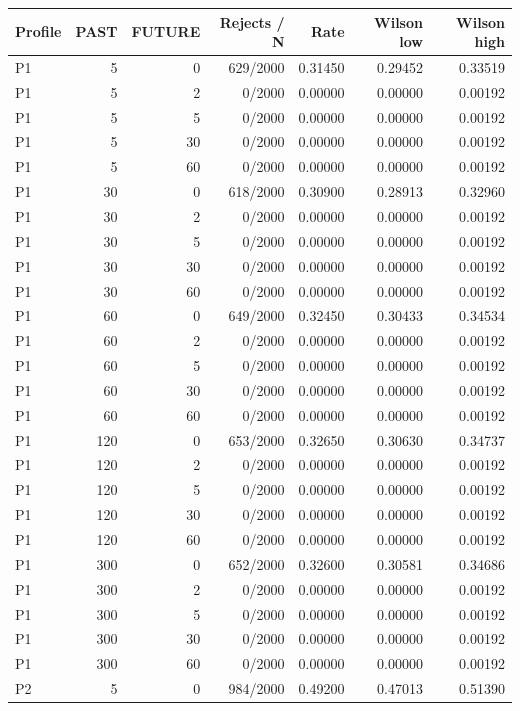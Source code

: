 \begin{tabular}{lrrrrrr}\toprule
Profile & PAST & FUTURE & Rejects / N & Rate & Wilson low & Wilson high \\
\midrule
P1 & 5 & 0 & 629/2000 & 0.31450 & 0.29452 & 0.33519 \\
P1 & 5 & 2 & 0/2000 & 0.00000 & 0.00000 & 0.00192 \\
P1 & 5 & 5 & 0/2000 & 0.00000 & 0.00000 & 0.00192 \\
P1 & 5 & 30 & 0/2000 & 0.00000 & 0.00000 & 0.00192 \\
P1 & 5 & 60 & 0/2000 & 0.00000 & 0.00000 & 0.00192 \\
P1 & 30 & 0 & 618/2000 & 0.30900 & 0.28913 & 0.32960 \\
P1 & 30 & 2 & 0/2000 & 0.00000 & 0.00000 & 0.00192 \\
P1 & 30 & 5 & 0/2000 & 0.00000 & 0.00000 & 0.00192 \\
P1 & 30 & 30 & 0/2000 & 0.00000 & 0.00000 & 0.00192 \\
P1 & 30 & 60 & 0/2000 & 0.00000 & 0.00000 & 0.00192 \\
P1 & 60 & 0 & 649/2000 & 0.32450 & 0.30433 & 0.34534 \\
P1 & 60 & 2 & 0/2000 & 0.00000 & 0.00000 & 0.00192 \\
P1 & 60 & 5 & 0/2000 & 0.00000 & 0.00000 & 0.00192 \\
P1 & 60 & 30 & 0/2000 & 0.00000 & 0.00000 & 0.00192 \\
P1 & 60 & 60 & 0/2000 & 0.00000 & 0.00000 & 0.00192 \\
P1 & 120 & 0 & 653/2000 & 0.32650 & 0.30630 & 0.34737 \\
P1 & 120 & 2 & 0/2000 & 0.00000 & 0.00000 & 0.00192 \\
P1 & 120 & 5 & 0/2000 & 0.00000 & 0.00000 & 0.00192 \\
P1 & 120 & 30 & 0/2000 & 0.00000 & 0.00000 & 0.00192 \\
P1 & 120 & 60 & 0/2000 & 0.00000 & 0.00000 & 0.00192 \\
P1 & 300 & 0 & 652/2000 & 0.32600 & 0.30581 & 0.34686 \\
P1 & 300 & 2 & 0/2000 & 0.00000 & 0.00000 & 0.00192 \\
P1 & 300 & 5 & 0/2000 & 0.00000 & 0.00000 & 0.00192 \\
P1 & 300 & 30 & 0/2000 & 0.00000 & 0.00000 & 0.00192 \\
P1 & 300 & 60 & 0/2000 & 0.00000 & 0.00000 & 0.00192 \\
P2 & 5 & 0 & 984/2000 & 0.49200 & 0.47013 & 0.51390 \\

\end{tabular}
